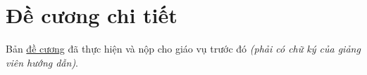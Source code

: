\chapter*{Đề cương chi tiết}
\label{thanks}

Bản \href{https://www.overleaf.com/read/jwrxbcrmkgfh}{đề cương} đã thực hiện và nộp cho giáo vụ trước đó \textit{(phải có chữ ký của giảng viên hướng dẫn)}.